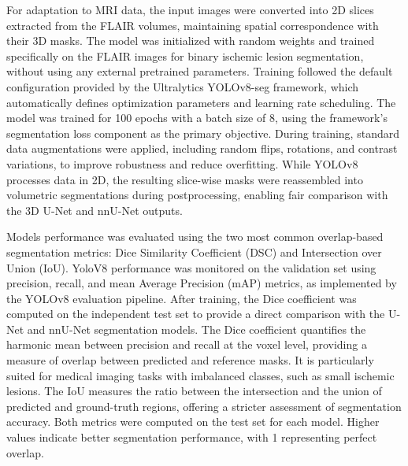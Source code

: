\documentclass[12pt]{article}
\begin{document}
For adaptation to MRI data, the input images were converted into 2D slices extracted from the FLAIR volumes, maintaining spatial correspondence with their 3D masks. The model was initialized with random weights and trained specifically on the FLAIR images for binary ischemic lesion segmentation, without using any external pretrained parameters.
%
Training followed the default configuration provided by the Ultralytics YOLOv8-seg framework, which automatically defines optimization parameters and learning rate scheduling. The model was trained for 100 epochs with a batch size of 8, using the framework’s segmentation loss component as the primary objective.
%
During training, standard data augmentations were applied, including random flips, rotations, and contrast variations, to improve robustness and reduce overfitting.
%
While YOLOv8 processes data in 2D, the resulting slice-wise masks were reassembled into volumetric segmentations during postprocessing, enabling fair comparison with the 3D U-Net and nnU-Net outputs.


Models performance was evaluated using the two most common overlap-based segmentation metrics: Dice Similarity Coefficient (DSC) and Intersection over Union (IoU). YoloV8 performance was monitored on the validation set using precision, recall, and mean Average Precision (mAP) metrics, as implemented by the YOLOv8 evaluation pipeline.
%
After training, the Dice coefficient was computed on the independent test set to provide a direct comparison with the U-Net and nnU-Net segmentation models.
The Dice coefficient quantifies the harmonic mean between precision and recall at the voxel level, providing a measure of overlap between predicted and reference masks. It is particularly suited for medical imaging tasks with imbalanced classes, such as small ischemic lesions. The IoU measures the ratio between the intersection and the union of predicted and ground-truth regions, offering a stricter assessment of segmentation accuracy.
%
Both metrics were computed on the test set for each model. Higher values indicate better segmentation performance, with 1 representing perfect overlap.

\end{document}

